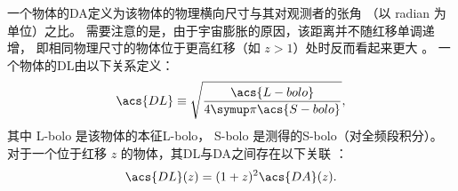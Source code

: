 一个物体的\acf{DA}定义为该物体的物理横向尺寸与其对观测者的张角
（以 \si{radian} 为单位）之比。
需要注意的是，由于宇宙膨胀的原因，该距离并不随红移单调递增，
即相同物理尺寸的物体位于更高红移（如 $z > 1$）处时反而看起来更大 \cite{hogg1999}。
一个物体的\acf{DL}由以下关系定义：
\begin{equation}
  \label{eq:dl-def}
  \acs{DL} \equiv \sqrt{\frac{\acs{L-bolo}}{4\Cpi \acs{S-bolo}}},
\end{equation}
其中 \acs{L-bolo} 是该物体的本征\acl{L-bolo}，
\acs{S-bolo} 是测得的\acl{S-bolo}（对全频段积分）。
对于一个位于红移 $z$ 的物体，其\acl{DL}与\acl{DA}之间存在以下关联
\cite{weinberg1972,hogg1999,ellis2007}：
\begin{equation}
  \label{eq:dl-da}
  \acs{DL}(z) = (1+z)^2 \acs{DA}(z).
\end{equation}


